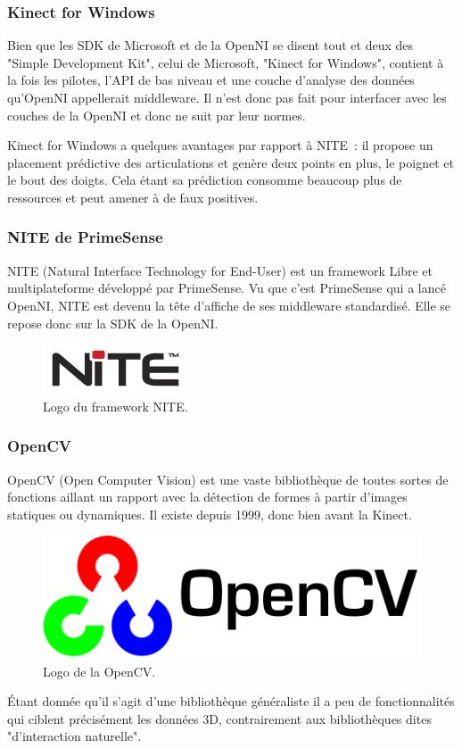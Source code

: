 \documentclass[french,12pt]{report}
\begin{document}
  
  \subsubsection{Kinect for Windows}  
  Bien que les SDK de Microsoft et de la OpenNI se disent tout et deux des 
  "Simple Development Kit",
  celui de Microsoft, "Kinect for Windows", contient à la fois les pilotes, 
  l'API de bas niveau et une couche d'analyse des données qu'OpenNI appellerait 
  middleware. Il n'est donc pas fait pour interfacer avec les couches de la 
  OpenNI et donc ne suit par leur normes.
  
  Kinect for Windows a quelques avantages par rapport à NITE~: il propose un
  placement prédictive des articulations et genère deux points en plus, 
  le poignet et le bout des doigts. Cela étant sa prédiction consomme beaucoup 
  plus de ressources et peut amener à de faux positives.
  
  \subsubsection{NITE de PrimeSense}
  NITE (Natural Interface Technology for End-User) est un framework Libre et 
  multiplateforme développé par PrimeSense. Vu que c'est PrimeSense qui a 
  lancé OpenNI, NITE est devenu la tête d'affiche de ses
  middleware standardisé. Elle se repose donc sur la SDK de la OpenNI. 
  \begin{figure}[h!]
  \centering
  \includegraphics[width=0.3\linewidth]{images/nite_logo}
  \caption{Logo du framework NITE.}
  \end{figure}
  
  \subsubsection{OpenCV}
  OpenCV (Open Computer Vision) est une vaste bibliothèque de toutes sortes de 
  fonctions aillant un rapport avec la détection de formes à partir d'images
  statiques ou dynamiques. Il existe depuis 1999, donc bien avant la Kinect.
  \begin{figure}[h!]
  \centering
  \includegraphics[width=0.4\linewidth]{images/opencv_logo}
  \caption{Logo de la OpenCV.}
  \end{figure}
  Étant donnée qu'il s'agit d'une bibliothèque généraliste il a peu de 
  fonctionnalités qui ciblent précisément les données 3D, contrairement aux 
  bibliothèques dites "d'interaction naturelle".
  
\end{document}
